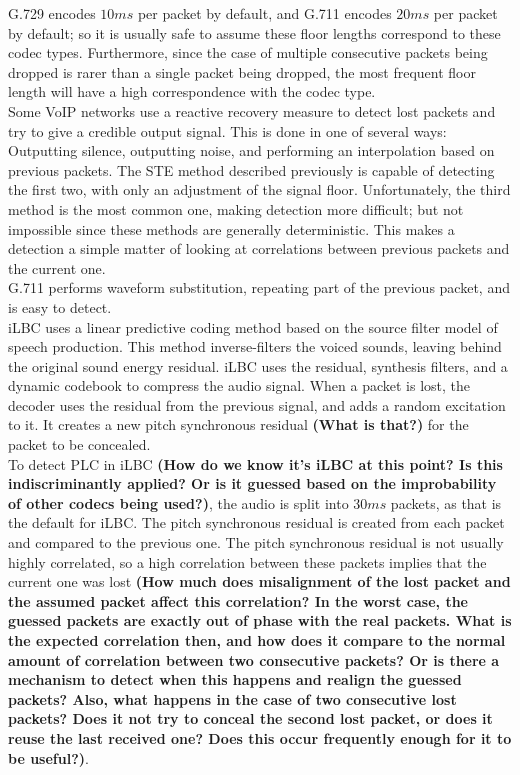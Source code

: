 \documentclass{article}
\begin{document}
G.729 encodes $10 ms$ per packet by default, and G.711 encodes $20 ms$ per packet by default;
so it is usually safe to assume these floor lengths correspond to these codec types.
Furthermore, since the case of multiple consecutive packets being dropped is rarer than a single packet being dropped,
the most frequent floor length will have a high correspondence with the codec type.\\
Some VoIP networks use a reactive recovery measure to detect lost packets and try to give a credible output signal.
This is done in one of several ways: Outputting silence, outputting noise,
and performing an interpolation based on previous packets.
The STE method described previously is capable of detecting the first two, with only an adjustment of the signal floor.
Unfortunately, the third method is the most common one, making detection more difficult;
but not impossible since these methods are generally deterministic.
This makes a detection a simple matter of looking at correlations between previous packets and the current one.\\
G.711 performs waveform substitution, repeating part of the previous packet, and is easy to detect.\\
iLBC uses a linear predictive coding method based on the source filter model of speech production.
This method inverse-filters the voiced sounds, leaving behind the original sound energy residual.
iLBC uses the residual, synthesis filters, and a dynamic codebook to compress the audio signal.
When a packet is lost, the decoder uses the residual from the previous signal,
and adds a random excitation to it.
It creates a new pitch synchronous residual {\bf(What is that?)} for the packet to be concealed.\\
To detect PLC in iLBC
{\bf(How do we know it's iLBC at this point? Is this indiscriminantly applied?
  Or is it guessed based on the improbability of other codecs being used?)},
the audio is split into $30 ms$ packets, as that is the default for iLBC.
The pitch synchronous residual is created from each packet and compared to the previous one.
The pitch synchronous residual is not usually highly correlated,
so a high correlation between these packets implies that the current one was lost
{\bf(How much does misalignment of the lost packet and the assumed packet affect this correlation?
  In the worst case, the guessed packets are exactly out of phase with the real packets.
  What is the expected correlation then,
  and how does it compare to the normal amount of correlation between two consecutive packets?
  Or is there a mechanism to detect when this happens and realign the guessed packets?
  Also, what happens in the case of two consecutive lost packets?
  Does it not try to conceal the second lost packet, or does it reuse the last received one?
  Does this occur frequently enough for it to be useful?)}.
\end{document}
